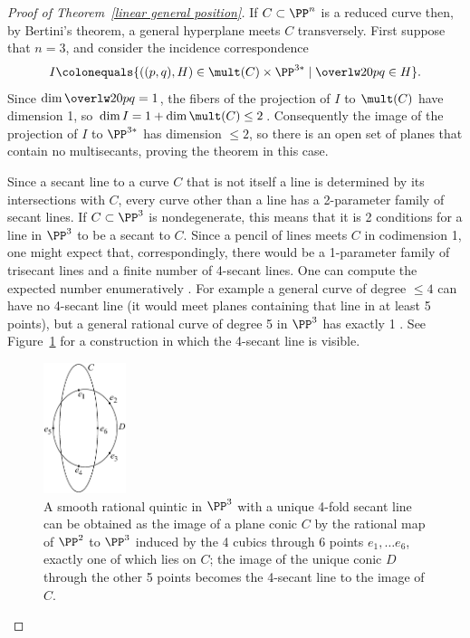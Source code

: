 \begin{proof}[Proof of Theorem~\ref{linear general position}]
If
$C\subset \PP^n$ is a reduced curve then, by Bertini's theorem, a general
%
hyperplane meets $C$ transversely.
First suppose that $n=3$, and consider the incidence correspondence
$$
I \colonequals  \{ ((p,q), H) \in \mult(C) \times \PP^{3*} \mid
\overlw20{pq}\in H\}.
$$
Since $\dim \overlw20{pq} = 1$, the fibers of the projection of $I$
to $\mult(C)$ have dimension 1,
so $\dim I = 1+\dim \mult(C)  \leq 2$. Consequently the image of  the
projection of $I$ to $\PP^{3*}$ has
dimension $\leq 2$, so there is an open set of planes that contain no
multisecants, proving the theorem in this case.

\begin{fact}
 Since a secant line to a curve $C$ that is not itself a line is
 determined by its intersections with $C$,
 every curve other than a line has a 2-parameter family of secant
 lines. If $C\subset \PP^3$ is nondegenerate,
 this means that it is 2 conditions for a line in $\PP^3$ to be a secant
 to $C$. Since a pencil of lines meets
 $C$ in codimension 1, one might expect that, correspondingly, there
 would be a 1-parameter family
 of trisecant lines and a finite number of 4-secant lines. One can
 compute the expected number enumeratively
 \cite[p.~296]{Griffiths-Harris1978}.
 For example a general curve of degree $\leq 4$ can have no 4-secant
 line (it would meet planes containing that line in at least 5 points),
 but a general rational curve of degree 5 in $\PP^3$
  has exactly 1 \cite[Section 12.4.4]{3264}. See  Figure~\ref{9.2}
  for a construction in which the 4-secant line is visible.

\begin{figure}[b]
\centerline {\includegraphics[height=1.5in]{"main/Fig09-2"}}
\caption{A smooth rational quintic in $\PP^{3}$ with a unique 4-fold
secant line
can be obtained as the image of a plane conic $C$ by the rational map
of $\PP^{2}$ to $\PP^{3}$
induced by the 4 cubics through 6 points $e_{1},\dots e_{6}$, exactly
one of which lies on $C$; the image of the unique conic $D$ through the
other 5 points becomes the 4-secant line to the image of $C$.
}
\label{9.2}
\end{figure}


\end{fact}
\end{proof}
